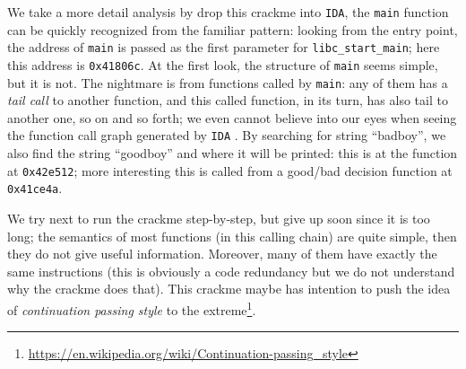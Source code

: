 \documentclass{easychair}
\begin{document}
We take a more detail analysis by drop this crackme into \texttt{IDA}, the \texttt{main} function can be quickly recognized from the familiar pattern: looking from the entry point, the address of \texttt{main} is passed as the first parameter for \texttt{libc\_start\_main}; here this address is \texttt{0x41806c}. At the first look, the structure of \texttt{main} seems simple, but it is not. The nightmare is from functions called by \texttt{main}: any of them has a \emph{tail call} to another function, and this called function, in its turn, has also tail to another one, so on and so forth; we even cannot believe into our eyes when seeing the function call graph generated by \texttt{IDA} \frownie{}. By searching for string ``badboy'', we also find the string ``goodboy'' and where it will be printed: this is at the function at \texttt{0x42e512}; more interesting this is called from a good/bad decision function at \texttt{0x41ce4a}.

We try next to run the crackme step-by-step, but give up soon since it is too long; the semantics of most functions (in this calling chain) are quite simple, then they do not give useful information. Moreover, many of them have exactly the same instructions (this is obviously a code redundancy but we do not understand why the crackme does that). This crackme maybe has intention to push the idea of \emph{continuation passing style} to the extreme\footnote{\url{https://en.wikipedia.org/wiki/Continuation-passing_style}}.
\end{document}
